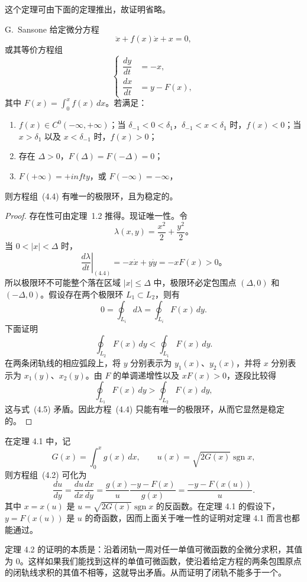 这个定理可由下面的定理推出，故证明省略。

\begin{theorem}{G.~Sansone}{}
给定微分方程
\[
 \ddot{x}+f(x)\dot{x}+x=0, \tag{4.3}
\]
或其等价方程组
\[
 \left\{
 \begin{aligned}
 \dfrac{dy}{dt}&=-x,\\
 \dfrac{dx}{dt}&=y-F(x),
 \end{aligned}\right. \tag{4.4}
\]
其中 $F(x)=\int_0^x f(x)\,dx$。若满足：

\begin{enumerate}
\item $f(x)\in C^0(-\infty,+\infty)$；当 $\delta_{-1}<0<\delta_1$，$\delta_{-1}<x<\delta_1$ 时，$f(x)<0$；当 $x>\delta_1$ 以及 $x<\delta_{-1}$ 时，$f(x)>0$；
\item 存在 $\Delta>0$，$F(\Delta)=F(-\Delta)=0$；
\item $F(+\infty)=+infty$，或 $F(-\infty)=-\infty$，
\end{enumerate}
则方程组~(4.4) 有唯一的极限环，且为稳定的。
\end{theorem}

\begin{proof}
存在性可由定理~1.2 推得。现证唯一性。令
\[
 \lambda(x,y)=\dfrac{x^2}{2}+\dfrac{y^2}{2}。
\]
当 $0<|x|<\Delta$ 时，
\[
 \left.\dfrac{d\lambda}{dt}\right|_{(4.4)}=-x\dot{x}+y\dot{y}=-xF(x)>0。
\]
所以极限环不可能整个落在区域 $|x|\leq\Delta$ 中，极限环必定包围点 $(\Delta,0)$ 和 $(-\Delta,0)$。假设存在两个极限环 $L_1\subset L_2$，则有
\[
 0=\oint_{L_i}d\lambda=\oint_{L_i}F(x)\,dy. \tag{4.5}
\]
下面证明
\[
 \oint_{L_2}F(x)\,dy<\oint_{L_1}F(x)\,dy. \tag{4.6}
\]
在两条闭轨线的相应弧段上，将 $y$ 分别表示为 $y_1(x)$、$y_2(x)$，并将 $x$ 分别表示为 $x_1(y)$、$x_2(y)$。由 $F$ 的单调递增性以及 $xF(x)>0$，逐段比较得
\[
 \oint_{L_1}F(x)\,dy>\oint_{L_2}F(x)\,dy,
\]
这与式~(4.5) 矛盾。因此方程~(4.4) 只能有唯一的极限环，从而它显然是稳定的。
\end{proof}

在定理 4.1 中，记
\[
G(x)=\int_0^xg(x)\,dx,\qquad
u(x)=\sqrt{2G(x)}\operatorname{sgn}x,
\]
则方程组~(4.2) 可化为
\[
\dfrac{du}{dy}=
\dfrac{du}{dx}\dfrac{dx}{dy}
=\dfrac{g(x)}{u}\dfrac{-y-F(x)}{g(x)}
=\dfrac{-y-F(x(u))}{u}. \tag{4.12}
\]
其中 $x=x(u)$ 是 $u=\sqrt{2G(x)}\operatorname{sgn}x$ 的反函数。在定理 4.1 的假设下，
$y=F(x(u))$ 是 $u$ 的奇函数，因而上面关于唯一性的证明对定理 4.1 而言也都能通过。

定理 4.2 的证明的本质是：沿着闭轨一周对任一单值可微函数的全微分求积，其值为 $0$。这样如果我们能找到这样的单值可微函数，使沿着给定方程的两条包围原点的闭轨线求积的其值不相等，这就导出矛盾。从而证明了闭轨不能多于一个。

